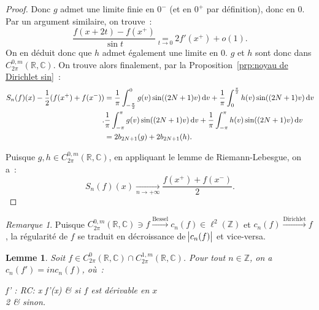 \documentclass{report}
\newtheorem{lem}[thm]{Lemme}
\theoremstyle{definition}
\theoremstyle{remark}
\newtheorem*{rmq}{Remarque}
\numberwithin{equation}{section}
\newcommand{\C}{\mathbb C}
\newcommand{\R}{\mathbb R}
\newcommand{\Z}{\mathbb Z}
\newcommand{\pinfty}{{+\infty}}
\newcommand{\CmT}[2]{C^{#1,m}_{#2}}
\newcommand{\CzmT}[1]{\CmT 0{#1}}
\newcommand{\Czm}{\CzmT{2\pi}}
\newcommand{\ComT}[1]{\CmT 1{#1}}
\newcommand{\Com}{\ComT {2\pi}}
\begin{document}
\begin{proof}
			Donc $g$ admet une limite finie en $0^-$ (et en $0^+$ par définition), donc en $0$. Par un argument similaire, on trouve~:
			\begin{equation}
				\frac {f(x+2t)-f(x^+)}{\sin t} \underset {t \to 0}= 2f'(x^+) + o(1).
			\end{equation}
			On en déduit donc que $h$ admet également une limite en $0$. $g$ et $h$ sont donc dans $\Czm(\R, \C)$. On trouve alors finalement, par la
			Proposition~\ref{prp:noyau de Dirichlet sin}~:
			\begin{align}
				S_n(f)(x) - \frac 12(f(x^+)+f(x^-)) &= \frac 1\pi\int_{-\frac \pi2}^0g(v)\sin((2N+1)v)\dif v + \frac 1\pi\int_0^{\frac \pi2}h(v)\sin((2N+1)v)\dif v \\.
				&\frac 1\pi\int_{-\pi}^\pi g(v)\sin((2N+1)v)\dif v + \frac 1\pi\int_{-\pi}^\pi h(v)\sin((2N+1)v)\dif v \\
				&= 2b_{2N+1}(g) + 2b_{2N+1}(h).
			\end{align}

			Puisque $g, h \in \Czm(\R, \C)$, en appliquant le lemme de Riemann-Lebesgue, on a~:
			\begin{equation}
				S_n(f)(x) \xrightarrow[n \to \pinfty]{} \frac {f(x^+)+f(x^-)}2.
			\end{equation}
			\end{proof}

			\begin{rmq} Puisque $\Czm(\R, \C) \ni f \xrightarrow{\text{Bessel}} c_n(f) \in \ell^2(\Z)$ et $c_n(f) \xrightarrow {\text{Dirichlet}} f$, la régularité
			de $f$ se traduit en décroissance de $\abs {c_n(f)}$ et vice-versa.  %
			\end{rmq}

			\begin{lem}\label{lem:c_n(f')=inc_n(f)} Soit $f \in C^0_{2\pi}(\R, \C) \cap \Com(\R, \C)$. Pour tout $n \in \Z$, on a $c_n(f') = inc_n(f)$, où~:
			\begin{subnumcases}
				{f' : \R \to \C : x \mapsto}
				f'(x) & si $f$ est dérivable en $x$ \\
				2 & sinon.
			\end{subnumcases}
			\end{lem}
\end{document}
